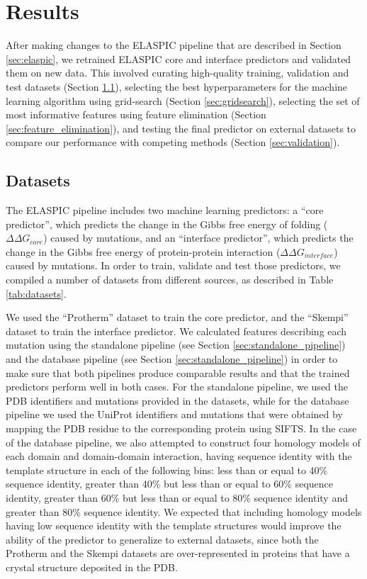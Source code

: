
\chapter{Results} \label{ch:results}

After making changes to the ELASPIC pipeline that are described in Section \ref{sec:elaspic}, we retrained ELASPIC core and interface predictors and validated them on new data. This involved curating high-quality training, validation and test datasets (Section \ref{sec:datasets}), selecting the best hyperparameters for the machine learning algorithm using grid-search (Section \ref{sec:gridsearch}), selecting the set of most informative features using feature elimination (Section \ref{sec:feature_elimination}), and testing the final predictor on external datasets to compare our performance with competing methods (Section \ref{sec:validation}).


\section{Datasets} \label{sec:datasets}

The ELASPIC pipeline includes two machine learning predictors: a ``core predictor'', which predicts the change in the Gibbs free energy of folding ($\Delta \Delta G_{core}$) caused by mutations, and an ``interface predictor'', which predicts the change in the Gibbs free energy of protein-protein interaction ($\Delta \Delta G_{interface}$) caused by mutations. In order to train, validate and test those predictors, we compiled a number of datasets from different sources, as described in Table \ref{tab:datasets}.

We used the ``Protherm'' dataset to train the core predictor, and the ``Skempi'' dataset to train the interface predictor. We calculated features describing each mutation using the standalone pipeline (see Section \ref{sec:standalone_pipeline}) and the database pipeline (see Section \ref{sec:standalone_pipeline}) in order to make sure that both pipelines produce comparable results and that the trained predictors perform well in both cases. For the standalone pipeline, we used the PDB identifiers and mutations provided in the datasets, while for the database pipeline we used the UniProt identifiers and mutations that were obtained by mapping the PDB residue to the corresponding protein using SIFTS. In the case of the database pipeline, we also attempted to construct four homology models of each domain and domain-domain interaction, having sequence identity with the template structure in each of the following bins: less than or equal to 40\% sequence identity, greater than 40\% but less than or equal to 60\% sequence identity, greater than 60\% but less than or equal to 80\% sequence identity and greater than 80\% sequence identity. We expected that including homology models having low sequence identity with the template structures would improve the ability of the predictor to generalize to external datasets, since both the Protherm and the Skempi datasets are over-represented in proteins that have a crystal structure deposited in the PDB.

